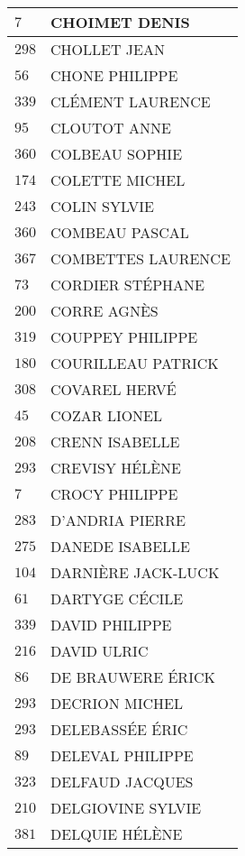 \begin{xltabular}{\linewidth}{|l|X|}
    \hline
    $7$ & CHOIMET DENIS \\
    \hline
    $298$ & CHOLLET JEAN \\
    \hline
    $56$ & CHONE PHILIPPE \\
    \hline
    $339$ & CLÉMENT LAURENCE \\
    \hline
    $95$ & CLOUTOT ANNE \\
    \hline
    $360$ & COLBEAU SOPHIE \\
    \hline
    $174$ & COLETTE MICHEL \\
    \hline
    $243$ & COLIN SYLVIE \\
    \hline
    $360$ & COMBEAU PASCAL \\
    \hline
    $367$ & COMBETTES LAURENCE \\
    \hline
    $73$ & CORDIER STÉPHANE \\
    \hline
    $200$ & CORRE AGNÈS \\
    \hline
    $319$ & COUPPEY PHILIPPE \\
    \hline
    $180$ & COURILLEAU PATRICK \\
    \hline
    $308$ & COVAREL HERVÉ \\
    \hline
    $45$ & COZAR LIONEL \\
    \hline
    $208$ & CRENN ISABELLE \\
    \hline
    $293$ & CREVISY HÉLÈNE \\
    \hline
    $7$ & CROCY PHILIPPE \\
    \hline
    $283$ & D'ANDRIA PIERRE \\
    \hline
    $275$ & DANEDE ISABELLE \\
    \hline
    $104$ & DARNIÈRE JACK-LUCK \\
    \hline
    $61$ & DARTYGE CÉCILE \\
    \hline
    $339$ & DAVID PHILIPPE \\
    \hline
    $216$ & DAVID ULRIC \\
    \hline
    $86$ & DE BRAUWERE ÉRICK \\
    \hline
    $293$ & DECRION MICHEL \\
    \hline
    $293$ & DELEBASSÉE ÉRIC \\
    \hline
    $89$ & DELEVAL PHILIPPE \\
    \hline
    $323$ & DELFAUD JACQUES \\
    \hline
    $210$ & DELGIOVINE SYLVIE \\
    \hline
    $381$ & DELQUIE HÉLÈNE \\
    \hline

\end{xltabular}
